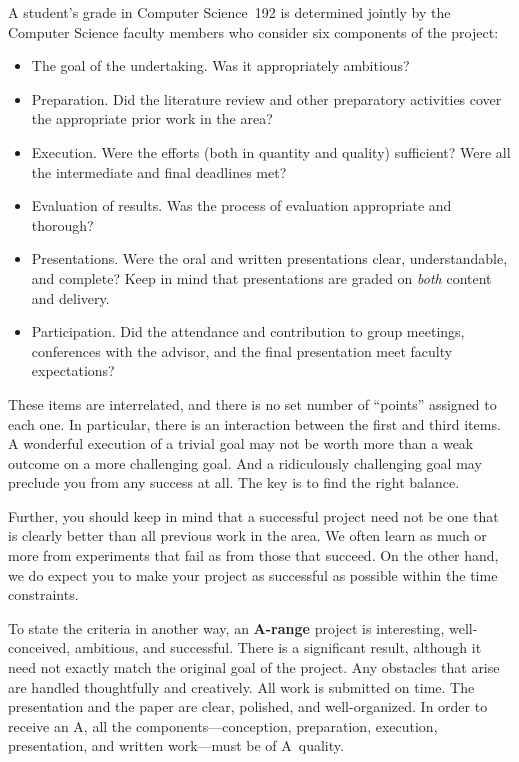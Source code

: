 \documentclass[finalcopy]{srpaper}
\let\phantomsection\relax
\begin{document}
A student's grade in Computer Science~192 is determined jointly
by the Computer Science faculty members who consider six
components of the project:
\begin{itemize}
\item The goal of the undertaking. Was it appropriately
ambitious?
\item Preparation. Did the literature review and other 
preparatory activities cover the appropriate prior work in
the area?
\item Execution. Were the efforts (both in quantity and
quality) sufficient? Were all the intermediate and final
deadlines met?
\item Evaluation of results. Was the process of evaluation
appropriate and thorough?
\item Presentations. Were the oral and written presentations
clear, understandable, and complete? Keep in mind that
presentations are graded on \emph{both} content and delivery.
\item Participation. Did the attendance and contribution to
group meetings, conferences with the advisor, and the final
presentation meet faculty expectations?
\end{itemize}
These items are interrelated, and there is no set number of 
``points'' assigned to each one. In particular,
there is an interaction between the first and third items.
A wonderful execution of a trivial goal may not be worth 
more than a weak outcome on a more challenging goal.  And a
ridiculously challenging goal may preclude you from any success
at all. The key is to find the right balance.

Further, you should keep in mind that a successful project need
not be one that is clearly better than all previous work in the
area.  We often learn as much or more from experiments that fail
as from those that succeed.  On the other hand, we do expect you
to make your project as successful as possible within the time
constraints.

\phantomsection
{}
To state the criteria in another way,
an\label{Page:ProjectGrading} \textbf{A-range} project is
interesting, well-conceived, ambitious, and
successful. There is a significant result, although it need
not exactly match the original goal of the project. Any
obstacles that arise are handled thoughtfully and
creatively. All work is submitted on time. The presentation
and the paper are clear, polished, and
well-organized. In order to receive an A, all the
components---conception, preparation, execution,
presentation, and written work---must be of A~quality.
\end{document}

